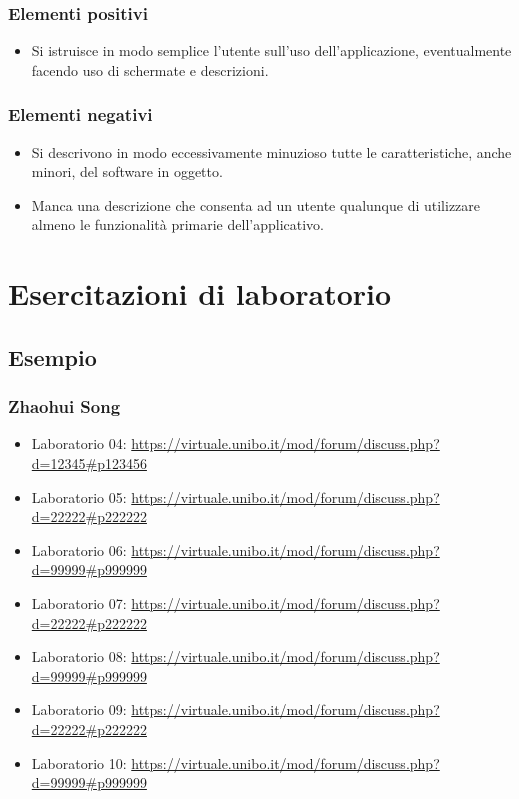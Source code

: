\documentclass[a4paper,12pt]{report}
\begin{document}
\subsection*{Elementi positivi}

\begin{itemize}
 \item Si istruisce in modo semplice l'utente sull'uso dell'applicazione, eventualmente facendo uso di schermate e descrizioni.
\end{itemize}

\subsection*{Elementi negativi}
\begin{itemize}
 \item Si descrivono in modo eccessivamente minuzioso tutte le caratteristiche, anche minori, del software in oggetto.
 \item Manca una descrizione che consenta ad un utente qualunque di utilizzare almeno le funzionalità primarie dell'applicativo.
\end{itemize}

\chapter{Esercitazioni di laboratorio}


\section*{Esempio}

\subsection{Zhaohui Song}

\begin{itemize}
 \item Laboratorio 04: \url{https://virtuale.unibo.it/mod/forum/discuss.php?d=12345#p123456}
 \item Laboratorio 05: \url{https://virtuale.unibo.it/mod/forum/discuss.php?d=22222#p222222}
 \item Laboratorio 06: \url{https://virtuale.unibo.it/mod/forum/discuss.php?d=99999#p999999}
 \item Laboratorio 07: \url{https://virtuale.unibo.it/mod/forum/discuss.php?d=22222#p222222}
 \item Laboratorio 08: \url{https://virtuale.unibo.it/mod/forum/discuss.php?d=99999#p999999}
 \item Laboratorio 09: \url{https://virtuale.unibo.it/mod/forum/discuss.php?d=22222#p222222}
 \item Laboratorio 10: \url{https://virtuale.unibo.it/mod/forum/discuss.php?d=99999#p999999}

\end{itemize}




\end{document}
